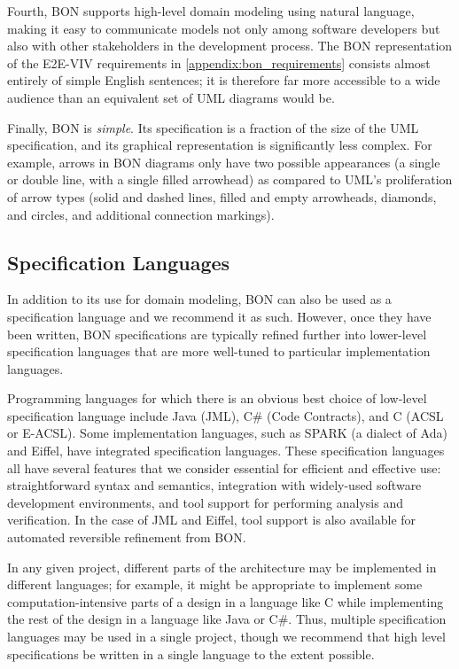 Fourth, BON supports high-level domain modeling using natural
language, making it easy to communicate models not only among software
developers but also with other stakeholders in the development
process. The BON representation of the E2E-VIV requirements in
\autoref{appendix:bon_requirements} consists almost entirely of simple
English sentences; it is therefore far more accessible to a wide
audience than an equivalent set of UML diagrams would be.

Finally, BON is \emph{simple}. Its specification is a fraction of the
size of the UML specification, and its graphical representation is
significantly less complex. For example, arrows in BON diagrams only
have two possible appearances (a single or double line, with a single
filled arrowhead) as compared to UML's proliferation of arrow types
(solid and dashed lines, filled and empty arrowheads, diamonds, and
circles, and additional connection markings). 

\subsection{Specification Languages}

In addition to its use for domain modeling, BON can also be used as a
specification language and we recommend it as such. However, once they
have been written, BON specifications are typically refined further
into lower-level specification languages that are more well-tuned to
particular implementation languages.

Programming languages for which there is an obvious best choice of
low-level specification language include Java (JML), C\# (Code
Contracts), and C (ACSL or E-ACSL). Some implementation languages,
such as SPARK (a dialect of Ada)~\cite{SPARK2014} and Eiffel, have
integrated specification languages. These specification languages all
have several features that we consider essential for efficient and
effective use: straightforward syntax and semantics, integration with
widely-used software development environments, and tool support for
performing analysis and verification. In the case of JML and Eiffel,
tool support is also available for automated reversible refinement
from BON.

In any given project, different parts of the architecture may be
implemented in different languages; for example, it might be
appropriate to implement some computation-intensive parts of a design
in a language like C while implementing the rest of the design in a
language like Java or C\#. Thus, multiple specification languages may
be used in a single project, though we recommend that high level
specifications be written in a single language to the extent possible.

